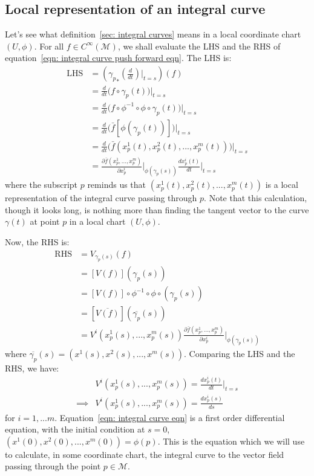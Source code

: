     \subsection{Local representation of an integral curve}
      Let's see what definition~\ref{sec: integral curves} means in a
      local coordinate chart $(U,\phi)$. For all $f \in
      C^\infty(\mathcal{M})$, we shall evaluate the LHS and the RHS of
      equation~\ref{eqn: integral curve push forward eqn}. The LHS is:
      \begin{align*}
        \text{LHS} &= \left({\gamma_{p}}_{*} \left(\frac{d}{dt}\right)\biggr|_{t =
        s}\right)(f) \\
        &= \frac{d}{dt} \Big(f\circ \gamma_p(t)\Big)\Bigr|_{t = s} \\
        &= \frac{d}{dt} \Big(f\circ \phi^{-1} \circ \phi \circ
        \gamma_p(t)\Big)\Bigr|_{t = s} \\
        &= \frac{d}{dt} \Big(\bar{f}[\phi(\gamma_p(t))]\Big)\Bigr|_{t = s} \\
        &= \frac{d}{dt}
        \Big(\bar{f}(x_p^1(t),x_p^2(t),...,x_p^m(t))\Big)\Bigr|_{t = s} \\
        &= \frac{\partial \bar{f}(x_p^1,...,x_p^m)}{\partial
        x_p^i}\Bigr|_{\phi(\gamma_p(s))} \frac{d x_p^i(t)}{dt}\Bigr|_{t =
        s}
      \end{align*}
      where the subscript $p$ reminds us that
      $(x_p^1(t),x_p^2(t),...,x_p^m(t))$ is a local representation of the
      integral curve passing through $p$. Note that this calculation,
      though it looks long, is nothing more than finding the tangent vector
      to the curve $\gamma(t)$ at point $p$ in a local chart $(U, \phi)$.
      
      Now, the RHS is:
    \begin{align*}
      \text{RHS} &= V_{\gamma_p(s)}(f) \\ 
      &= [V(f)](\gamma_p(s)) \\
      &= [V(f)]\circ \phi^{-1} \circ \phi \circ (\gamma_p(s)) \\
      &= [\overline{V(f)}](\overline{\gamma_p}(s))\\
      &= V^i(x_p^1(s),...,x_p^m(s)) \frac{\partial
      \bar{f}(x_p^1,...,x_p^m)}{\partial
      x_p^i}\biggr|_{\phi(\gamma_p(s))}
    \end{align*}
    where $\overline{\gamma_p}(s) = (x^1(s), x^2(s),...,x^m(s))$. Comparing
    the LHS and the RHS, we have:
    \begin{align}
      &V^i(x_p^1(s),...,x_p^m(s)) = \frac{d x_p^i(t)}{dt}\Bigr|_{t = s}
      \nonumber \\
      \implies & V^i(x_p^1(s),...,x_p^m(s)) = \frac{d x_p^i(s)}{ds}
      \label{eqn: integral curve eqn}
    \end{align}
    for $i = 1,...m$. Equation~\ref{eqn: integral curve eqn} is a first
    order differential equation, with the initial condition at $s = 0$,
    $(x^1(0), x^2(0),...,x^m(0)) = \phi(p)$. This is the equation which we
    will use to calculate, in some coordinate chart, the integral curve to
    the vector field passing through the point $p \in \mathcal{M}$.

